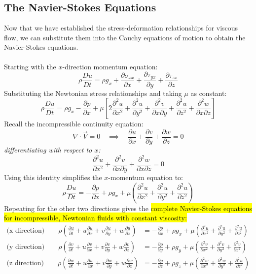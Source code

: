 ﻿\documentclass[12pt]{article}
\begin{document}
\subsection*{The Navier-Stokes Equations}
Now that we have established the stress-deformation relationships for viscous flow, we can substitute them into the Cauchy equations of motion to obtain the Navier-Stokes equations.\\\\
Starting with the $x$-direction momentum equation:
\[
\rho\frac{Du}{Dt}=\rho g_x+\frac{\partial\sigma_{xx}}{\partial x}+\frac{\partial\tau_{yx}}{\partial y}+\frac{\partial\tau_{zx}}{\partial z}
\]
Substituting the Newtonian stress relationships and taking \(\mu\) as constant:
\[
\rho\frac{Du}{Dt}=\rho g_x-\frac{\partial p}{\partial x}+\mu\left[2\frac{\partial^2u}{\partial x^2}+\frac{\partial^2u}{\partial y^2}+\frac{\partial^2v}{\partial x\partial y}+\frac{\partial^2u}{\partial z^2}+\frac{\partial^2w}{\partial x\partial z}\right]
\]
Recall the incompressible continuity equation:
\[\nabla \cdot \vec{V} = 0\quad\implies\quad \frac{\partial u}{\partial x}+\frac{\partial v}{\partial y}+\frac{\partial w}{\partial z}=0\]
\textit{differentiating with respect to $x$:}
\[
\frac{\partial^2u}{\partial x^2}+\frac{\partial^2v}{\partial x\partial y}+\frac{\partial^2w}{\partial x\partial z}=0
\]
Using this identity simplifies the $x$-momentum equation to:
\[\rho\frac{Du}{Dt}=-\frac{\partial p}{\partial x}+\rho g_x+\mu\left(\frac{\partial^2u}{\partial x^2}+\frac{\partial^2u}{\partial y^2}+\frac{\partial^2u}{\partial z^2}\right)
\]
Repeating for the other two directions gives the \hl{complete Navier-Stokes equations for incompressible, Newtonian fluids with constant viscosity:}
\[\boxed{
\begin{aligned}
\text{(x direction)}\qquad
\rho\left(\frac{\partial u}{\partial t}+u\frac{\partial u}{\partial x}+v\frac{\partial u}{\partial y}+w\frac{\partial u}{\partial z}\right)
&=-\frac{\partial p}{\partial x}+\rho g_x+\mu\left(\frac{\partial^2u}{\partial x^2}+\frac{\partial^2u}{\partial y^2}+\frac{\partial^2u}{\partial z^2}\right)\\[8pt]
\text{(y direction)}\qquad
\rho\left(\frac{\partial v}{\partial t}+u\frac{\partial v}{\partial x}+v\frac{\partial v}{\partial y}+w\frac{\partial v}{\partial z}\right)
&=-\frac{\partial p}{\partial y}+\rho g_y+\mu\left(\frac{\partial^2v}{\partial x^2}+\frac{\partial^2v}{\partial y^2}+\frac{\partial^2v}{\partial z^2}\right)\\[8pt]
\text{(z direction)}\qquad
\rho\left(\frac{\partial w}{\partial t}+u\frac{\partial w}{\partial x}+v\frac{\partial w}{\partial y}+w\frac{\partial w}{\partial z}\right)
&=-\frac{\partial p}{\partial z}+\rho g_z+\mu\left(\frac{\partial^2w}{\partial x^2}+\frac{\partial^2w}{\partial y^2}+\frac{\partial^2w}{\partial z^2}\right)
\end{aligned}}
\]
\end{document}
